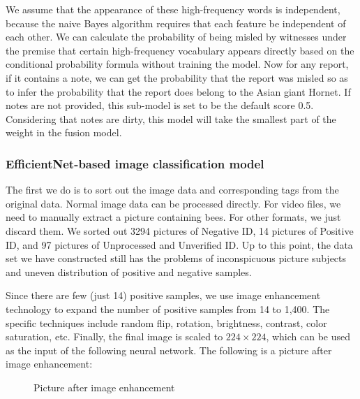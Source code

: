 \documentclass{mcmthesis}
\numberwithin{figure}{section}
\numberwithin{table}{section}
\begin{document}
We assume that the appearance of these high-frequency words is independent, because the naive Bayes algorithm requires that each feature be independent of each other. We can calculate the probability of being misled by witnesses under the premise that certain high-frequency vocabulary appears directly based on the conditional probability formula without training the model. Now for any report, if it contains a note, we can get the probability that the report was misled so as to infer the probability that the report does belong to the Asian giant Hornet. If notes are not provided,  this sub-model is set to be the default score 0.5. Considering that notes are dirty, this model will take the smallest part of the weight in the fusion model.

\subsubsection{EfficientNet-based image classification model}

The first we do is to sort out the image data and corresponding tags from the original data. Normal image data can be processed directly. For video files, we need to manually extract a picture containing bees. For other formats, we just discard them. We sorted out 3294 pictures of Negative ID, 14 pictures of Positive ID, and 97 pictures of Unprocessed and Unverified ID. Up to this point, the data set we have constructed still has the problems of inconspicuous picture subjects and uneven distribution of positive and negative samples.

Since there are few (just 14) positive samples, we use image enhancement technology to expand the number of positive samples from 14 to 1,400. The specific techniques include random flip, rotation, brightness, contrast, color saturation, etc. Finally, the final image is scaled to $224 \times 224$, which can be used as the input of the following neural network. The following is a picture after image enhancement:

\begin{figure}[H]
  \caption{Picture after image enhancement}\label{sohfwaf}
\end{figure}
\end{document}
